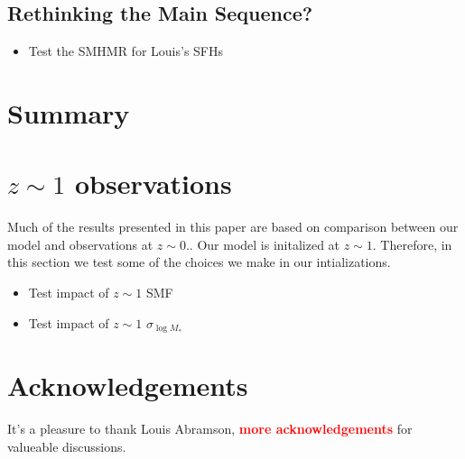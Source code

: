 \documentclass[12pt, letterpaper, preprint]{aastex}
\newcommand{\todo}[1]{{\bf \textcolor{red}{#1}}}
\newcommand{\bitem}{\begin{itemize}}
\newcommand{\eitem}{\end{itemize}}
\begin{document}
\subsection{Rethinking the Main Sequence?}
\bitem 
\item Test the SMHMR for Louis's SFHs 
\eitem 

\section{Summary} \label{sec:summary}


\appendix
\section{$z \sim 1$ observations} \label{app:z1}
Much of the results presented in this paper are based on comparison 
between our model and observations at $z \sim 0.$. Our model is initalized 
at $z \sim 1$. Therefore, in this section we test some of the choices 
we make in our intializations. 

\bitem
\item Test impact of $z \sim 1$ SMF
\item Test impact of $z \sim 1$ $\sigma_{\log M_*}$ 
\eitem

\section*{Acknowledgements}
It's a pleasure to thank 
    Louis Abramson, 
    \todo{more acknowledgements} 
for valueable discussions. 



\end{document}
